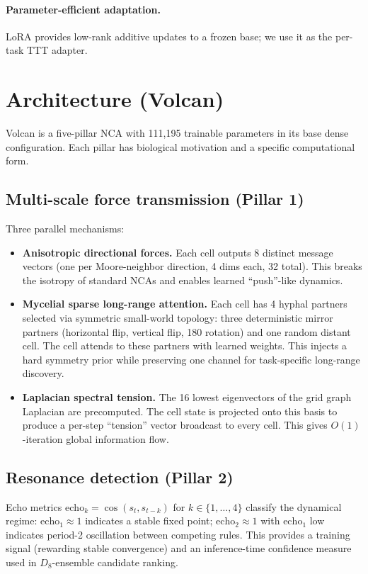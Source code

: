 \documentclass[11pt]{article}
\begin{document}
\paragraph{Parameter-efficient adaptation.} LoRA \citep{hu2022lora} provides low-rank additive updates to a frozen base; we use it as the per-task TTT adapter.

\section{Architecture (Volcan)}
\label{sec:architecture}

Volcan is a five-pillar NCA with 111{,}195 trainable parameters in its base dense configuration. Each pillar has biological motivation and a specific computational form.

\subsection{Multi-scale force transmission (Pillar 1)}

Three parallel mechanisms:
\begin{itemize}
    \item \textbf{Anisotropic directional forces.} Each cell outputs 8 distinct message vectors (one per Moore-neighbor direction, 4 dims each, 32 total). This breaks the isotropy of standard NCAs and enables learned ``push''-like dynamics.
    \item \textbf{Mycelial sparse long-range attention.} Each cell has 4 hyphal partners selected via symmetric small-world topology: three deterministic mirror partners (horizontal flip, vertical flip, 180\textdegree{} rotation) and one random distant cell. The cell attends to these partners with learned weights. This injects a hard symmetry prior while preserving one channel for task-specific long-range discovery.
    \item \textbf{Laplacian spectral tension.} The 16 lowest eigenvectors of the grid graph Laplacian are precomputed. The cell state is projected onto this basis to produce a per-step ``tension'' vector broadcast to every cell. This gives $O(1)$-iteration global information flow.
\end{itemize}

\subsection{Resonance detection (Pillar 2)}

Echo metrics $\mathrm{echo}_k = \cos(s_t, s_{t-k})$ for $k \in \{1,\ldots,4\}$ classify the dynamical regime: $\mathrm{echo}_1 \approx 1$ indicates a stable fixed point; $\mathrm{echo}_2 \approx 1$ with $\mathrm{echo}_1$ low indicates period-2 oscillation between competing rules. This provides a training signal (rewarding stable convergence) and an inference-time confidence measure used in $D_8$-ensemble candidate ranking.
\end{document}
